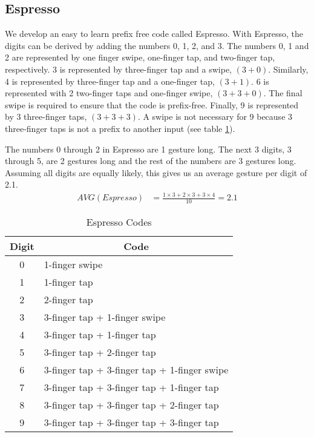 \subsection{Espresso}
We develop an easy to learn prefix free code called Espresso. With Espresso, the digits can be derived by adding the numbers 0, 1, 2, and 3. The numbers 0, 1 and 2 are represented by one finger swipe, one-finger tap, and two-finger tap, respectively. 3 is represented by three-finger tap and a swipe, $(3+0)$. Similarly, 4 is represented by three-finger tap and a one-finger tap, $(3+1)$. 6 is represented with 2 two-finger taps and one-finger swipe, $(3+3+0)$. The final swipe is required to ensure that the code is prefix-free. Finally, 9 is represented by 3 three-finger taps, $(3+3+3)$. A swipe is not necessary for 9 because 3 three-finger taps is not a prefix to another input (see table \ref{espresso}).
\par
The numbers 0 through 2 in Espresso are 1 gesture long. The next 3 digits, 3 through 5, are 2 gestures long and the rest of the numbers are 3 gestures long. Assuming all digits are equally likely, this gives us an average gesture per digit of 2.1.
  \begin{align*}
    AVG(Espresso) &= \frac{1\times3 + 2\times3 + 3\times4}{10} = 2.1
  \end{align*}
  
\begin{table}[ht]
  \caption{Espresso Codes}
  \centering
  \begin{tabular}{cl}
  \hline
  \multicolumn{1}{c}{Digit} & \multicolumn{1}{c}{Code} \\
  \hline
  0 & 1-finger swipe \\
  1 & 1-finger tap \\
  2 & 2-finger tap \\
  3 & 3-finger tap + 1-finger swipe \\
  4 & 3-finger tap + 1-finger tap \\
  5 & 3-finger tap + 2-finger tap \\
  6 & 3-finger tap + 3-finger tap + 1-finger swipe \\
  7 & 3-finger tap + 3-finger tap + 1-finger tap \\
  8 & 3-finger tap + 3-finger tap + 2-finger tap \\
  9 & 3-finger tap + 3-finger tap + 3-finger tap \\ [1ex]
  \hline
  \end{tabular}
  \label{espresso}
\end{table}

